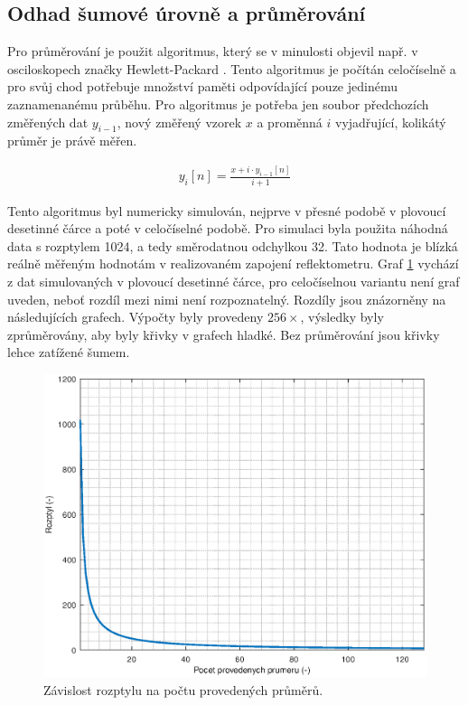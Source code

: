 \subsection{Odhad šumové úrovně a průměrování}
Pro průměrování je použit algoritmus, který se v minulosti objevil např. v osciloskopech značky Hewlett-Packard \cite{HP54100_article_journal}. Tento algoritmus je počítán celočíselně a pro svůj chod potřebuje množství paměti odpovídající pouze jedinému zaznamenanému průběhu. Pro algoritmus je potřeba jen soubor předchozích změřených dat $ y_{i-1}$, nový změřený vzorek $x$ a proměnná $i$ vyjadřující, kolikátý průměr je právě měřen.

\begin{equation}
\begin{gathered}
	y_i[n]=	\frac{x+i \cdot y_{i-1}[n]}{i+1}
\end{gathered}
\end{equation}

Tento algoritmus byl numericky simulován, nejprve v přesné podobě v plovoucí desetinné čárce a poté v celočíselné podobě. Pro simulaci byla použita náhodná data s rozptylem 1024, a tedy směrodatnou odchylkou 32. Tato hodnota je blízká reálně měřeným hodnotám v realizovaném zapojení reflektometru. Graf \ref{averaging_variance} vychází z dat simulovaných v plovoucí desetinné čárce, pro celočíselnou variantu není graf uveden, neboť rozdíl mezi nimi není rozpoznatelný. Rozdíly jsou znázorněny na následujících grafech. Výpočty byly provedeny $256\times$, výsledky byly zprůměrovány, aby byly křivky v grafech hladké. Bez průměrování jsou křivky lehce zatížené šumem.

\begin{figure}[htbp]
\includegraphics[width=\textwidth,keepaspectratio]{images/averaging_float_variance.eps}\caption{Závislost rozptylu na počtu provedených průměrů.}\label{averaging_variance}
\end{figure}	

